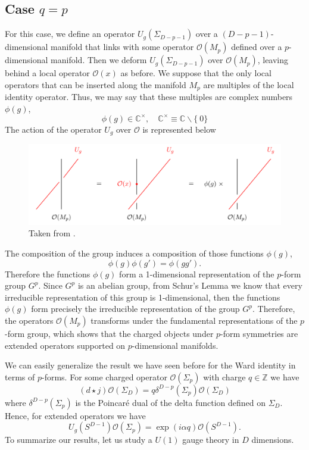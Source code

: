 \documentclass{article}
\begin{document}
\subsection*{Case $q=p$}
For this case, we define an operator $U_g(\Sigma_{D-p-1})$ over a $(D-p-1)$-dimensional manifold that links with some operator  $\mathcal{O}(M_p)$ defined over a $p$-dimensional manifold. Then we deform $U_g(\Sigma_{D-p-1})$  over $\mathcal{O}(M_p)$, leaving behind a local operator $\mathcal{O}(x)$ as before. We suppose that the only local operators that can be inserted along the manifold $M_p$ are multiples of the local identity operator. Thus, we may say that these multiples are complex numbers $\phi(g)$,  
$$
\phi(g)\in \mathbb{C}^{\times},\quad \mathbb{C}^{\times}\equiv \mathbb{C}\backslash\{\ 0 \}
$$
The action of the operator $U_g$ over $\mathcal{O}$ is represented below 
\begin{figure}[h]
	\centering
	\includegraphics[scale=0.4]{figures/linking2.png}
	\caption{Taken from \cite{Bhardwaj}.} 
\end{figure}
The composition of the group induces a composition of those functions $\phi(g)$, 
\begin{equation}
	\phi(g)\phi(g')=\phi(gg').
\end{equation}
Therefore the functions $\phi(g)$ form a 1-dimensional representation of the $p$-form group $G^p$.  Since $G^p$ is an abelian group, from Schur’s Lemma we know that every irreducible representation of this group is 1-dimensional, then the functions $\phi(g)$ form precisely the irreducible representation of the group $G^p$. Therefore, the operators $\mathcal{O}(M_p)$ transforms under the fundamental representations of the $p$-form group, which shows that the charged objects under $p$-form symmetries are extended operators supported on $p$-dimensional manifolds. 

We can easily generalize the result we have seen before for the Ward identity in terms of $p$-forms. For some  charged operator $\mathcal{O}(\Sigma_p)$ with charge $q\in\mathbb{Z}$ we have
\begin{equation}\label{action of hf symmetry}
	(d\star j)\mathcal{O}(\Sigma_D)=q\delta^{D-p}(\Sigma_p)\mathcal{O}(\Sigma_D)
\end{equation}
where $\delta^{D-p}(\Sigma_p)$  is the Poincaré dual of the delta function defined on $\Sigma_D$. Hence, for extended operators we have 
\begin{equation}
	U_g(S^{D-1})\mathcal{O}(\Sigma_p)=\exp(i\alpha q)\mathcal{O}(S^{D-1}).
\end{equation}
To summarize our results, let us study a $U(1)$ gauge theory in $D$ dimensions. 
\end{document}
